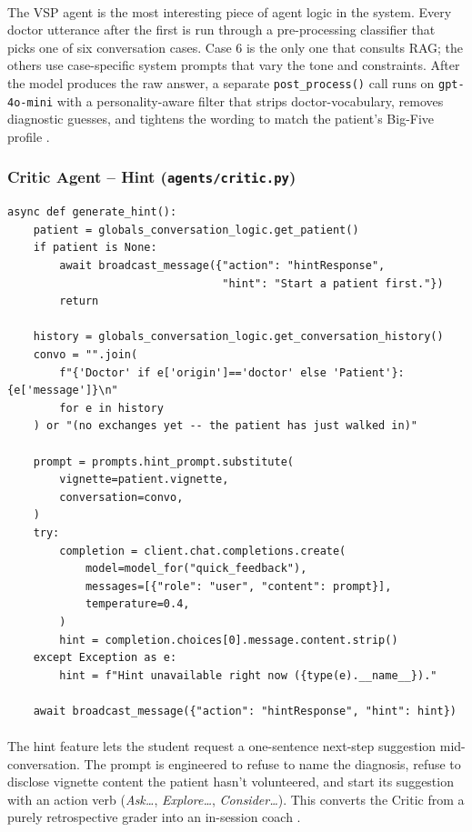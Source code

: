\documentclass{article}
\begin{document}
\paragraph{}
The VSP agent is the most interesting piece of agent logic in the system. Every doctor utterance after the first is run through a pre-processing classifier that picks one of six conversation cases. Case 6 is the only one that consults RAG; the others use case-specific system prompts that vary the tone and constraints. After the model produces the raw answer, a separate \texttt{post\_process()} call runs on \texttt{gpt-4o-mini} with a personality-aware filter that strips doctor-vocabulary, removes diagnostic guesses, and tightens the wording to match the patient's Big-Five profile \cite{Zhang2023SentimentAI}.

\subsubsection{Critic Agent -- Hint (\texttt{agents/critic.py})}

\begin{lstlisting}[style=codeblock]
async def generate_hint():
    patient = globals_conversation_logic.get_patient()
    if patient is None:
        await broadcast_message({"action": "hintResponse",
                                 "hint": "Start a patient first."})
        return

    history = globals_conversation_logic.get_conversation_history()
    convo = "".join(
        f"{'Doctor' if e['origin']=='doctor' else 'Patient'}: {e['message']}\n"
        for e in history
    ) or "(no exchanges yet -- the patient has just walked in)"

    prompt = prompts.hint_prompt.substitute(
        vignette=patient.vignette,
        conversation=convo,
    )
    try:
        completion = client.chat.completions.create(
            model=model_for("quick_feedback"),
            messages=[{"role": "user", "content": prompt}],
            temperature=0.4,
        )
        hint = completion.choices[0].message.content.strip()
    except Exception as e:
        hint = f"Hint unavailable right now ({type(e).__name__})."

    await broadcast_message({"action": "hintResponse", "hint": hint})
\end{lstlisting}

\paragraph{}
The hint feature lets the student request a one-sentence next-step suggestion mid-conversation. The prompt is engineered to refuse to name the diagnosis, refuse to disclose vignette content the patient hasn't volunteered, and start its suggestion with an action verb (\emph{Ask\ldots}, \emph{Explore\ldots}, \emph{Consider\ldots}). This converts the Critic from a purely retrospective grader into an in-session coach \cite{Krugmann2024SentimentAI}.
\end{document}
